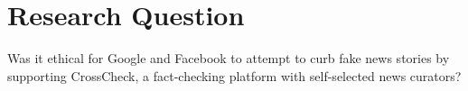 
\section{Research Question}

Was it ethical for Google and Facebook to attempt to curb fake news stories by supporting CrossCheck, a fact-checking platform with self-selected news curators?